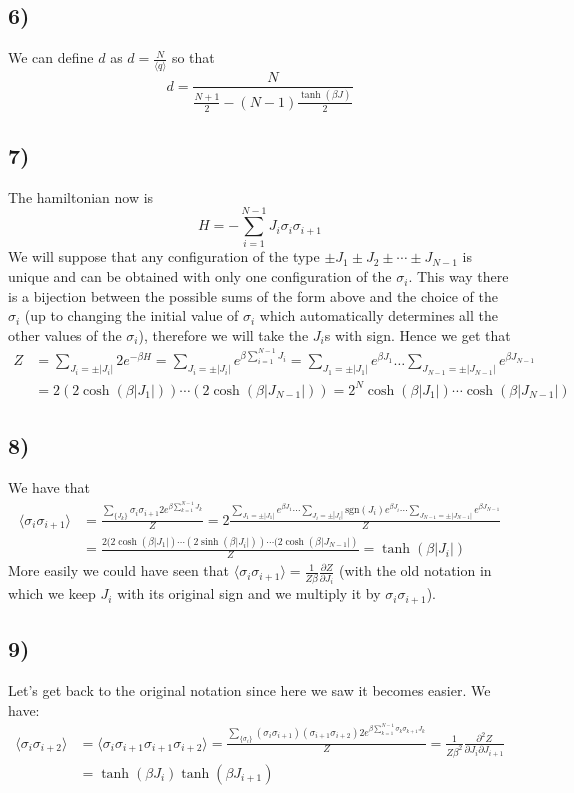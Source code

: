 \documentclass[10pt,a4paper]{book}
\newcommand{\p}{\partial}
\begin{document}
\subsection*{6)}
We can define $d$ as $d=\frac{N}{\langle q\rangle} $
so that 
$$d=\frac{N}{\frac{N+1}{2}-(N-1)\frac{\tanh(\beta J)}{2}}$$

\subsection*{7)}
The hamiltonian now is 
$$H=-\sum_{i=1}^{N-1}J_i\sigma_i\sigma_{i+1}$$
We will suppose that any configuration of the type $\pm J_1\pm J_2\pm\cdots\pm J_{N-1}$ is unique and can be obtained with only one configuration of the $\sigma_i$. This way there is a bijection between the possible sums of the form above and the choice of the $\sigma_i$ (up to changing the initial value of $\sigma_i$ which automatically determines all the other values of the $\sigma_i$), therefore we will take the $J_i$s with sign. Hence we get that
\begin{align*}
Z&=\sum_{J_i=\pm |J_i|} 2e^{-\beta H}=\sum_{J_i=\pm|J_i|}e^{\beta\sum_{i=1}^{N-1}J_i}=\sum_{J_1=\pm|J_1|}e^{\beta J_1}\ldots \sum_{J_{N-1}=\pm|J_{N-1}|}e^{\beta J_{N-1}}\\
&=2(2\cosh(\beta |J_1|))\cdots (2\cosh(\beta |J_{N-1}|))=2^{N}\cosh(\beta |J_1|)\cdots\cosh(\beta |J_{N-1}|)
\end{align*}

\subsection*{8)}
We have that
\begin{align*}
\langle \sigma_i\sigma_{i+1}\rangle &=\frac{\sum_{\{J_k\}}\sigma_i\sigma_{i+1}2e^{\beta\sum_{k=1}^{N-1}J_k}}{Z}=2\frac{\sum_{J_1=\pm|J_1|}e^{\beta J_1}\cdots \sum_{J_i=\pm|J_i|}\text{sgn}(J_i)e^{\beta J_i}\cdots \sum_{J_{N-1}=\pm|J_{N-1}|}e^{\beta J_{N-1}}}{Z}\\
&=\frac{2(2\cosh(\beta |J_1|)\cdots (2\sinh(\beta |J_i|))\cdots (2\cosh(\beta |J_{N-1}|)}{Z}=\tanh(\beta |J_i|)
\end{align*}
More easily we could have seen that $\langle \sigma_i\sigma_{i+1}\rangle =\frac{1}{Z\beta}\frac{\p Z}{\p J_i}$ (with the old notation in which we keep $J_i$ with its original sign and we multiply it by $\sigma_i\sigma_{i+1}$).

\subsection*{9)}
Let's get back to the original notation since here we saw it becomes easier. We have:
\begin{align*}
\langle \sigma_i\sigma_{i+2}\rangle&=\langle \sigma_i\sigma_{i+1}\sigma_{i+1}\sigma_{i+2}\rangle =\frac{\sum_{\{\sigma_i\}}(\sigma_i\sigma_{i+1})(\sigma_{i+1}\sigma_{i+2})2e^{\beta\sum_{k=1}^{N-1}\sigma_k\sigma_{k+1}J_k}}{Z}=\frac{1}{Z\beta^2}\frac{\p^2 Z}{\p J_i\p J_{i+1}}\\
&=\tanh(\beta J_i)\tanh(\beta J_{i+1})
\end{align*}
\end{document}
